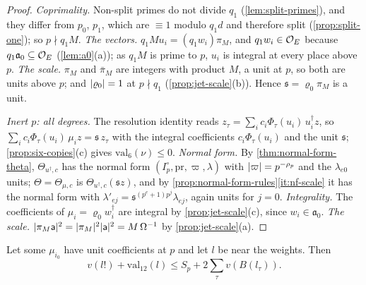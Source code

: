 \begin{proof}
\emph{Coprimality.} Non-split primes do not divide $q_1$ (\cref{lem:split-primes}), and they differ from $p_0$, $p_1$, which are $\equiv1$ modulo $q_1d$ and therefore split (\cref{prop:split-one}); so $p\nmid q_1M$. \emph{The vectors.} $q_1Mu_i=(q_1w_i)\pi_M$, and $q_1w_i\in\mathcal{O}_E$ because $q_1\mathfrak a_0\subseteq\mathcal{O}_E$ (\cref{lem:a0}(a)); as $q_1M$ is prime to $p$, $u_i$ is integral at every place above $p$. \emph{The scale.} $\pi_M$ and $\bar\pi_M$ are integers with product $M$, a unit at $p$, so both are units above $p$; and $\lvert \varrho_0\rvert=1$ at $p\nmid q_1$ (\cref{prop:jet-scale}(b)). Hence $\mathfrak s=\varrho_0\pi_M$ is a unit.

\emph{Inert $p$: all degrees.} The resolution identity reads $z_\tau=\sum_ic_i\Phi_\tau(u_i)\,u_i^\dagger z$, so $\sum_ic_i\Phi_\tau(u_i)\,\mu_iz=\mathfrak s\,z_\tau$ with the integral coefficients $c_i\Phi_\tau(u_i)$ and the unit $\mathfrak s$; \cref{prop:six-copies}(c) gives $\mathrm{val}_6(\nu)\le0$. \emph{Normal form.} By \cref{thm:normal-form-theta}, $\Theta_{u^\dagger,c}$ has the normal form $(I_p^\circ,\mathrm{pr},\varpi,\lambda)$ with $\lvert \varpi\rvert=p^{-\rho_p}$ and the $\lambda_{e0}$ units; $\Theta=\Theta_{\mu,c}$ is $\Theta_{u^\dagger,c}(\mathfrak sz)$, and by \cref{prop:normal-form-rules}\ref{it:nf-scale} it has the normal form with $\lambda'_{ej}=\mathfrak s^{(p^e+1)p^j}\lambda_{ej}$, again units for $j=0$. \emph{Integrality.} The coefficients of $\mu_i=\varrho_0w_i^\dagger$ are integral by \cref{prop:jet-scale}(c), since $w_i\in\mathfrak a_0$. \emph{The scale.} $\lvert \pi_M\mathsf a\rvert^2=\lvert \pi_M\rvert^2\lvert \mathsf a\rvert^2=M\,\Omega^{-1}$ by \cref{prop:jet-scale}(a).
\end{proof}

\begin{theorem}\label{thm:twelve-copies}
Let some $\mu_{i_0}$ have unit coefficients at $p$ and let $l$ be near the weights. Then
\[
  v(l!)+\mathrm{val}_{12}(l)\le S_p+2\sum_\tau v(B(l_\tau)).
\]
\end{theorem}

